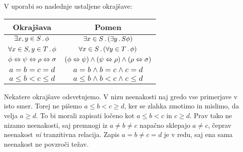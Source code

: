 V uporabi so naslednje ustaljene okrajšave:
%
\begin{center}
  \begin{tabular}{cc}
    \toprule
    Okrajšava & Pomen \\ \midrule
    $\exists x,y \in S \,.\, \phi$
    &
    $\exists x \in S \,.\, (\exists y \,.\,{S} \phi)$
    \\
    $\forall x \in S, y \in T \,.\, \phi$
    &
    $\forall x \in S \,.\,(\forall y \in T \,.\, \phi)$
    \\
    $\phi \Leftrightarrow \psi \Leftrightarrow \rho \Leftrightarrow \sigma$
    &
    $(\phi \Leftrightarrow \psi) \land (\psi \Leftrightarrow \rho) \land (\rho \Leftrightarrow \sigma)$
    \\
    $a = b = c = d$
    &
    $a = b \land b = c \land c = d$
    \\
    $a \leq b < c \leq d$
    &
    $a \leq b \land b < c \land c \leq d$
    \\
    \bottomrule
  \end{tabular}
\end{center}
%
Nekatere okrajšave odsvetujemo. V nizu neenakosti naj gredo vse
primerjave v isto smer. Torej ne pišemo $a \leq b < c \geq d$, ker se
zlahka zmotimo in mislimo, da velja $a \geq d$. To bi morali zapisati
ločeno kot $a \leq b < c$ in $c \geq d$. Prav tako ne nizamo neenakosti,
saj premnogi iz $a \neq b \neq c$ napačno sklepajo $a \neq c$,
čeprav neenakost \emph{ni} tranzitivna relacija. Zapis $a =
b \neq c = d$ je v redu, saj ena sama neenakost ne povzroči težav.

